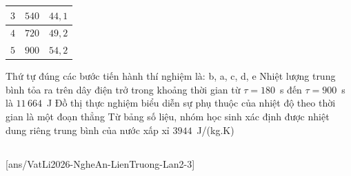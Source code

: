 \begin{ex}
\begin{center}
\begin{minipage}[c]{0.44\linewidth}
{\begin{tabular}{|c|c|c|}
					\hline
					$3$ & $540$ & $44{,}1$\\
					\hline
					$4$ & $720$ & $49{,}2$\\
					\hline
					$5$ & $900$ & $54{,}2$\\
					\hline
				\end{tabular}}
			\end{minipage}
		\end{center}
		\choiceTFt
		{Thứ tự đúng các bước tiến hành thí nghiệm là: b, a, c, d, e}
		{\True Nhiệt lượng trung bình tỏa ra trên dây điện trở trong khoảng thời gian từ $\tau=180$~s đến $\tau=900$~s là $11\,664$~J}
		{\True Đồ thị thực nghiệm biểu diễn sự phụ thuộc của nhiệt độ theo thời gian là một đoạn thẳng}
		{\True Từ bảng số liệu, nhóm học sinh xác định được nhiệt dung riêng trung bình của nước xấp xỉ $3944$~J/(kg.K)}
	\end{ex}

	\subsection*{}
	\setcounter{ex}{0}
	[ans/VatLi2026-NgheAn-LienTruong-Lan2-3]

